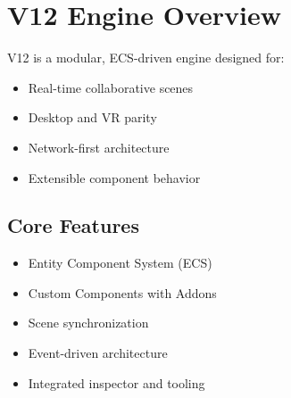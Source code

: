 \section{V12 Engine Overview}

V12 is a modular, ECS-driven engine designed for:
\begin{itemize}
	\item Real-time collaborative scenes
	\item Desktop and VR parity
	\item Network-first architecture
	\item Extensible component behavior
\end{itemize}

\subsection{Core Features}
\begin{itemize}
	\item Entity Component System (ECS)
	\item Custom Components with Addons
	\item Scene synchronization
	\item Event-driven architecture
	\item Integrated inspector and tooling
\end{itemize}
